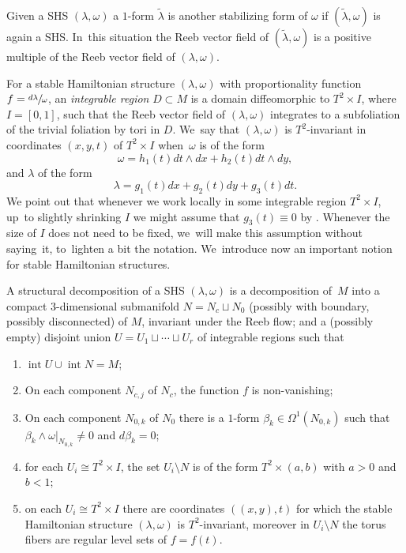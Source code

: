 Given a SHS $(\lambda,\omega)$ a $1$-form $\widetilde{\lambda}$ is another stabilizing form of $\omega$ if $(\widetilde{\lambda}, \omega)$ is again a SHS. In~this situation the Reeb vector field of $(\widetilde{\lambda},\omega)$ is a positive multiple of the Reeb vector field of $(\lambda,\omega)$.

For a stable Hamiltonian structure $(\lambda,\omega)$ with proportionality function $f=\sfrac{d\lambda}{\omega}$, an \textit{integrable region} $D\subset M$ is a domain diffeomorphic to $T^2\times I$, where $I=[0,1]$, such that the Reeb vector field of $(\lambda,\omega)$ integrates to a subfoliation of the trivial foliation by tori in $D$. We~say that $(\lambda,\omega)$ is $T^2$-invariant in coordinates $(x,y,t)$ of $T^2\times I$ when~$\omega$ is of the form
\begin{equation}\label{eq-omegaonreg}
\omega= h_1(t) dt\wedge dx + h_2(t) dt\wedge dy,
\end{equation}
and $\lambda$ of the form
\begin{equation}\label{eq-lambdaonreg}
\lambda = g_1(t) dx + g_2(t) dy + g_3(t)dt.
\end{equation}
We point out that whenever we work locally in some integrable region $T^2\times I$, up~to slightly shrinking $I$ we might assume that $g_3(t)\equiv 0$ by \cite[Lem.\,3.9]{CV1}. Whenever the size of $I$ does not need to be fixed, we~will make this assumption without saying~it, to~lighten a bit the notation. We~introduce now an important notion for stable Hamiltonian structures.
\begin{defi}\label{defn-strucdecom}
A structural decomposition of a SHS $(\lambda,\omega)$ is a decomposition of~$M$ into a compact $3$-dimensional submanifold $N=N_c \sqcup N_0$ (possibly with boundary, possibly disconnected) of $M$, invariant under the Reeb flow; and a (possibly empty) disjoint union $U=U_1\sqcup \cdots\sqcup U_r$ of integrable regions such that
\begin{enumerate}
\item\label{defn-strucdecom1} $\operatorname{int}U \cup \operatorname{int}N=M$;
\item\label{defn-strucdecom2} On each component $N_{c,j}$ of $N_c$, the function $f$ is non-vanishing;
\item\label{defn-strucdecom3} On each component $N_{0,k}$ of $N_0$ there is a $1$-form $\beta_k \in \Omega^1(N_{0,k})$ such that $\beta_k\wedge \omega|_{N_{0,k}}\neq 0$ and $d\beta_k=0$;
\item\label{defn-strucdecom4} for each $U_i\cong T^2\times I$, the set $U_i\setminus N$ is of the form $T^2\times (a,b)$ with $a>0$ and $b<1$;
\item\label{defn-strucdecom5} on each $U_i\cong T^2\times I$ there are coordinates $((x,y),t)$ for which the stable Hamiltonian structure $(\lambda,\omega)$ is $T^2$-invariant, moreover in $U_i\setminus N$ the torus fibers are regular level sets of $f=f(t)$.
\end{enumerate}
\end{defi}

